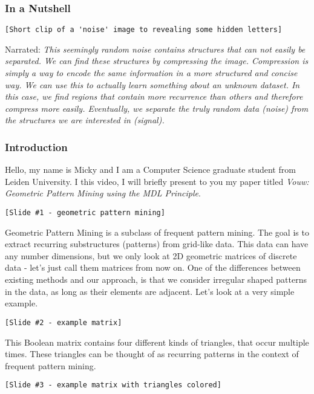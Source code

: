 \documentclass[10pt,a4paper,oneside]{article}
\author{Micky Faas}
\begin{document}
\subsubsection{In a Nutshell}
\begin{verbatim}
[Short clip of a 'noise' image to revealing some hidden letters]
\end{verbatim}
Narrated: \emph{This seemingly random noise contains structures that can not easily be separated. We can find these structures by compressing the image. Compression is simply a way to encode the same information in a more structured and concise way. We can use this to actually learn something about an unknown dataset. In this case, we find regions that contain more recurrence than others and therefore compress more easily. Eventually, we separate the truly random data (noise) from the structures we are interested in (signal).}

\subsubsection{Introduction}
Hello, my name is Micky and I am a Computer Science graduate student from Leiden University. I this video, I will briefly present to you my paper titled \emph{Vouw: Geometric Pattern Mining using the MDL Principle}. 

\begin{verbatim}
[Slide #1 - geometric pattern mining]
\end{verbatim}

Geometric Pattern Mining is a subclass of frequent pattern mining. The goal is to extract recurring substructures (patterns) from grid-like data. This data can have any number dimensions, but we only look at 2D geometric matrices of discrete data - let's just call them matrices from now on. One of the differences between existing methods and our approach, is that we consider irregular shaped patterns in the data, as long as their elements are adjacent. Let's look at a very simple example.

\begin{verbatim}
[Slide #2 - example matrix]
\end{verbatim}

This Boolean matrix contains four different kinds of triangles, that occur multiple times. These triangles can be thought of as recurring patterns in the context of frequent pattern mining. 

\begin{verbatim}
[Slide #3 - example matrix with triangles colored]
\end{verbatim}
\end{document}

